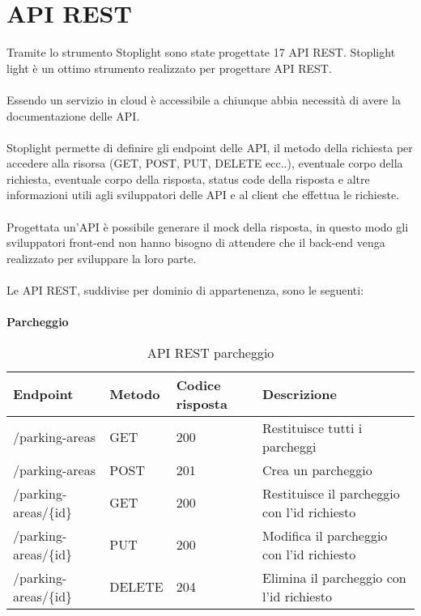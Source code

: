 \section{API REST}
Tramite lo strumento Stoplight sono state progettate 17 \gls{API} \gls{REST}. Stoplight light è un ottimo strumento realizzato
per progettare \gls{API} \gls{REST}.
\\\\
Essendo un servizio in cloud è accessibile a chiunque abbia necessità di avere la documentazione delle \gls{API}.
\\\\
Stoplight permette di definire gli \gls{endpoint} delle \gls{API}, il metodo della richiesta per accedere alla risorsa (GET, POST, PUT, DELETE ecc..),
eventuale corpo della richiesta, eventuale corpo della risposta, status code della risposta e altre informazioni
utili agli sviluppatori delle \gls{API} e al client che effettua le richieste.
\\\\
Progettata un'\gls{API} è possibile generare il \gls{mock} della risposta, in questo modo gli sviluppatori \gls{front-end} non hanno bisogno
di attendere che il \gls{back-end} venga realizzato per sviluppare la loro parte.
\\\\
Le \gls{API} \gls{REST}, suddivise per dominio di appartenenza, sono le seguenti:
\\\\
\textbf{Parcheggio}
\\
\begin{table}[H]
    \begin{tabular}{|p{3.2cm}|p{1.4cm}|p{1.4cm}|p{5.8cm}|} 
    \hline
    \textbf{Endpoint} & \textbf{Metodo} & \textbf{Codice risposta} & \textbf{Descrizione} \\ 
    \hline
    /parking-areas & GET & 200 & Restituisce tutti i parcheggi \\ 
    \hline
    /parking-areas & POST & 201 & Crea un parcheggio \\ 
    \hline
    /parking-areas/\{id\} & GET & 200 & Restituisce il parcheggio con l'id richiesto \\ 
    \hline
    /parking-areas/\{id\} & PUT & 200 & Modifica il parcheggio con l'id richiesto \\ 
    \hline
    /parking-areas/\{id\} & DELETE & 204 & Elimina il parcheggio con l'id richiesto \\ 
    \hline
    \end{tabular}
    \caption{API REST parcheggio}
\end{table}
